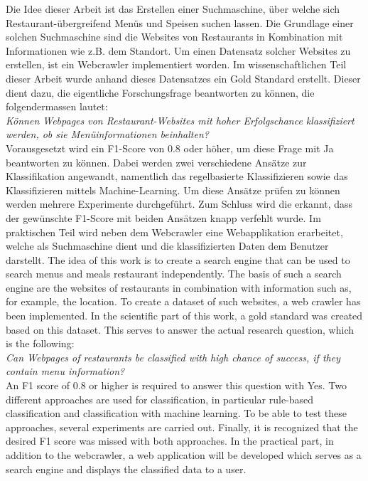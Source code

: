 Die Idee dieser Arbeit ist das Erstellen einer Suchmaschine, über welche sich Restaurant-übergreifend Menüs und Speisen suchen lassen.
Die Grundlage einer solchen Suchmaschine sind die Websites von Restaurants in Kombination mit Informationen wie z.B. dem Standort.
Um einen Datensatz solcher Websites zu erstellen, ist ein Webcrawler implementiert worden.
Im wissenschaftlichen Teil dieser Arbeit wurde anhand dieses Datensatzes ein Gold Standard erstellt.
Dieser dient dazu, die eigentliche Forschungsfrage beantworten zu können, die folgendermassen lautet:\\
\emph{Können Webpages von Restaurant-Websites mit hoher Erfolgschance klassifiziert werden, ob sie Menüinformationen beinhalten?}\\
Vorausgesetzt wird ein F1-Score von 0.8 oder höher, um diese Frage mit \glqq Ja\grqq{} beantworten zu können.
Dabei werden zwei verschiedene Ansätze zur Klassifikation angewandt, namentlich das regelbasierte Klassifizieren sowie das Klassifizieren mittels Machine-Learning.
Um diese Ansätze prüfen zu können werden mehrere Experimente durchgeführt.
Zum Schluss wird die erkannt, dass der gewünschte F1-Score mit beiden Ansätzen knapp verfehlt wurde.
Im praktischen Teil wird neben dem Webcrawler eine Webapplikation erarbeitet, welche als Suchmaschine dient und die klassifizierten Daten dem Benutzer darstellt.
The idea of this work is to create a search engine that can be used to search menus and meals restaurant independently.
The basis of such a search engine are the websites of restaurants in combination with information such as, for example, the location.
To create a dataset of such websites, a web crawler has been implemented.
In the scientific part of this work, a gold standard was created based on this dataset.
This serves to answer the actual research question, which is the following: \\
\emph{Can Webpages of restaurants be classified with high chance of success, if they contain menu information?} \\
An F1 score of 0.8 or higher is required to answer this question with \glqq Yes\grqq{}.
Two different approaches are used for classification, in particular rule-based classification and classification with machine learning.
To be able to test these approaches, several experiments are carried out.
Finally, it is recognized that the desired F1 score was missed with both approaches.
In the practical part, in addition to the webcrawler, a web application will be developed which serves as a search engine and displays the classified data to a user.